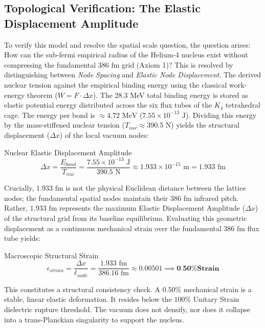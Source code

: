 \subsection{Topological Verification: The Elastic Displacement Amplitude}

To verify this model and resolve the spatial scale question, the question arises: How can the sub-fermi empirical radius of the Helium-4 nucleus exist without compressing the fundamental $386\text{ fm}$ grid (Axiom 1)? This is resolved by distinguishing between \textit{Node Spacing} and \textit{Elastic Node Displacement}. The derived nuclear tension against the empirical binding energy using the classical work-energy theorem ($W = F \cdot \Delta x$). The 28.3 MeV total binding energy is stored as elastic potential energy distributed across the six flux tubes of the $K_{4}$ tetrahedral cage. The energy per bond is $\approx 4.72\text{ MeV}$ ($7.55 \times 10^{-13}\text{ J}$). Dividing this energy by the mass-stiffened nuclear tension ($T_{nuc} \approx 390.5\text{ N}$) yields the structural displacement ($\Delta x$) of the local vacuum nodes:

\begin{resultbox}{Nuclear Elastic Displacement Amplitude}
\begin{equation}
    \Delta x = \frac{E_{bond}}{T_{nuc}} = \frac{7.55 \times 10^{-13}\text{ J}}{390.5\text{ N}} \approx 1.933 \times 10^{-15}\text{ m} = 1.933\text{ fm}
\end{equation}
\end{resultbox}
    
Crucially, $1.933\text{ fm}$ is not the physical Euclidean distance between the lattice nodes; the fundamental spatial nodes maintain their 386 fm infrared pitch. Rather, $1.933\text{ fm}$ represents the maximum Elastic Displacement Amplitude ($\Delta x$) of the structural grid from its baseline equilibrium. Evaluating this geometric displacement as a continuous mechanical strain over the fundamental 386 fm flux tube yields:
    
\begin{resultbox}{Macroscopic Structural Strain}
\begin{equation}
    \epsilon_{strain} = \frac{\Delta x}{\ell_{node}} = \frac{1.933\text{ fm}}{386.16\text{ fm}} \approx 0.00501 \implies \textbf{0.50\% Strain}
\end{equation}
\end{resultbox}

This constitutes a structural consistency check. A $0.50\%$ mechanical strain is a stable, linear elastic deformation. It resides below the $100\%$ Unitary Strain dielectric rupture threshold. The vacuum does not densify, nor does it collapse into a trans-Planckian singularity to support the nucleus.


